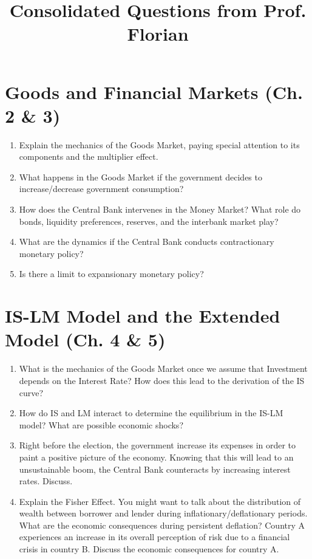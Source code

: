 \documentclass{extarticle}
\title{\vspace{-2em}Consolidated Questions from Prof. Florian}
\date{}
\begin{document}
\maketitle

\section{Goods and Financial Markets (Ch. 2 \& 3)}
\begin{enumerate}
    \item Explain the mechanics of the Goods Market, paying special attention to its components and the multiplier effect.
    \item What happens in the Goods Market if the government decides to increase/decrease government consumption?
    \item How does the Central Bank intervenes in the Money Market? What role do bonds, liquidity preferences, reserves, and the interbank market play?
    \item What are the dynamics if the Central Bank conducts contractionary monetary policy?
    \item Is there a limit to expansionary monetary policy?
\end{enumerate}

\section{IS-LM Model and the Extended Model (Ch. 4 \& 5)}
\begin{enumerate}
    \item What is the mechanics of the Goods Market once we assume that Investment depends on the Interest Rate? How does this lead to the derivation of the IS curve?
    \item How do IS and LM interact to determine the equilibrium in the IS-LM model? What are possible economic shocks?
    \item Right before the election, the government increase its expenses in order to paint a positive picture of the economy. Knowing that this will lead to an unsustainable boom, the Central Bank counteracts by increasing interest rates. Discuss.
    \item Explain the Fisher Effect. You might want to talk about the distribution of wealth between borrower and lender during inflationary/deflationary periods. What are the economic consequences during persistent deflation?
    Country A experiences an increase in its overall perception of risk due to a financial crisis in country B. Discuss the economic consequences for country A.
\end{enumerate}
\end{document}
